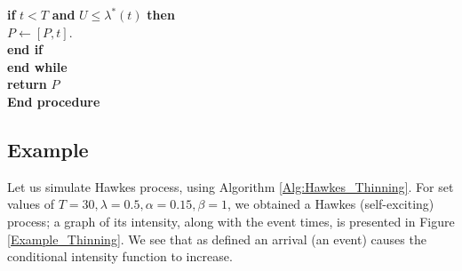 \begin{breakablealgorithm}
\begin{algorithmic}[H]
\begin{tabbing}
			\hspace{1cm}\textbf{if} $t < T$ \textbf{and} $U \leq \lambda^{*}(t) $ \textbf{then}
			\\
			\hspace{1.5cm}$P \leftarrow [P, t].$
			\\
			\hspace{1cm}\textbf{end if}
			\\
            \hspace{0.5cm}\textbf{end while}
			\\
			\hspace{0.5cm}\textbf{return} $P$
			\\
			\hspace{0.2cm}\= \textbf{End procedure}
		\end{tabbing}
	\end{algorithmic}
\end{breakablealgorithm}
\subsection{Example}

Let us simulate Hawkes process, using Algorithm \ref{Alg:Hawkes_Thinning}. For set values of $T=30, \lambda = 0.5, \alpha=0.15, \beta=1$, we obtained a Hawkes (self-exciting) process; a graph of its intensity, along with
the event times, is presented in Figure \ref{Example_Thinning}. We see that as defined an arrival (an event) causes the conditional intensity function to increase.


